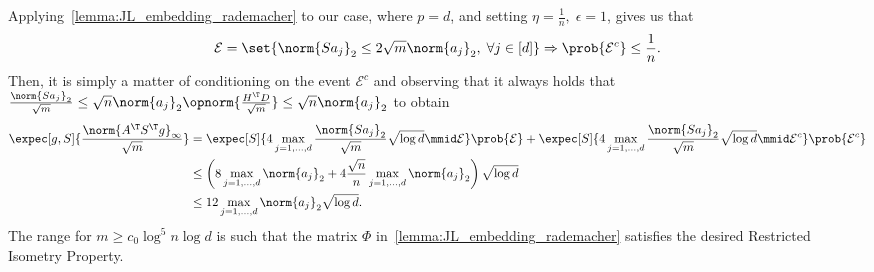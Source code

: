 \documentclass[a4paper]{article}
\begin{document}
Applying~\cref{lemma:JL_embedding_rademacher} to our case, where $p = d$, and
setting $\eta = \frac{1}{n}, \; \epsilon = 1$, gives us that
\[
	\mathcal{E} = \set{\norm{S a_j}_2 \leq 2 \sqrt{m} \norm{a_j}_2, \;
	\forall j \in [d]} \Rightarrow
	\prob{\mathcal{E}^c} \leq \frac{1}{n}.
\]
Then, it is simply a matter of conditioning on the event $\mathcal{E}^c$ and
observing that it always holds that $\frac{\norm{S a_j}_2}{\sqrt{m}} \leq \sqrt{n}
\norm{a_j}_2 \opnorm{\frac{H^\T D}{\sqrt{m}}} \leq \sqrt{n} \norm{a_j}_2$ to
obtain
\begin{align*}
	\expec[g, S]{\frac{\norm{A^\T S^\T g}_{\infty}}{\sqrt{m}}} &=
	\expec[S]{4 \max_{j=1,\dots,d} \frac{\norm{S a_j}_2}{\sqrt{m}}
		\sqrt{\log d} \mmid \mathcal{E}} \prob{\mathcal{E}} +
	\expec[S]{4 \max_{j=1, \dots, d} \frac{\norm{S a_j}_2}{\sqrt{m}}
		\sqrt{\log d} \mmid \mathcal{E}^c} \prob{\mathcal{E}^c} \\
    &\leq \left( 8 \max_{j = 1, \dots, d} \norm{a_j}_2
      + 4 \frac{\sqrt{n}}{n} \max_{j = 1, \dots, d} \norm{a_j}_2
      \right) \sqrt{\log d} \\
	&\leq 12 \max_{j = 1, \dots, d} \norm{a_j}_2 \sqrt{\log d}.
\end{align*}
The range for $m \geq c_0 \log^5 n \log d$ is such that the matrix $\Phi$
in~\cref{lemma:JL_embedding_rademacher} satisfies the desired Restricted
Isometry Property.



\end{document}
